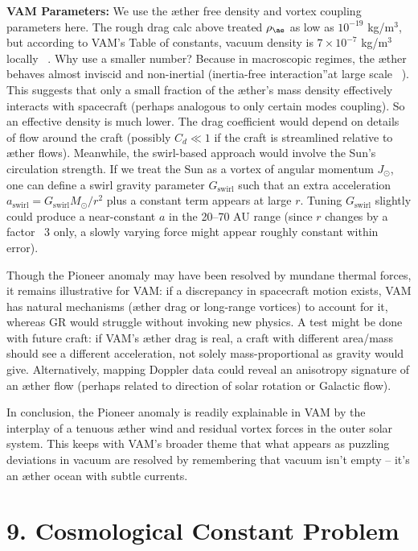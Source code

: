 \documentclass[a4paper, aps,preprint,superscriptaddress, 12pt]{revtex4}
\begin{document}
\textbf{VAM Parameters:} We use the æther free density and vortex coupling parameters here. The rough drag calc above treated $\rho_{\ae}$ as low as $10^{-19}$ kg/m$^3$, but according to VAM's Table of constants, vacuum density is $7\times10^{-7}$ kg/m$^3$ locally~\cite{VAM_constants} . Why use a smaller number? Because in macroscopic regimes, the æther behaves almost inviscid and non-inertial (\grqq inertia-free interaction\textquotedblright at large scale~\cite{Iskandarani2025b} ). This suggests that only a small fraction of the æther's mass density effectively interacts with spacecraft (perhaps analogous to only certain modes coupling). So an effective density is much lower. The drag coefficient would depend on details of flow around the craft (possibly $C_d\ll1$ if the craft is streamlined relative to æther flows). Meanwhile, the swirl-based approach would involve the Sun's circulation strength. If we treat the Sun as a vortex of angular momentum $J_\odot$, one can define a swirl gravity parameter $G_{\text{swirl}}$ such that an extra acceleration $a_{\text{swirl}} = G_{\text{swirl}} M_\odot/r^2$ plus a constant term appears at large $r$. Tuning $G_{\text{swirl}}$ slightly could produce a near-constant $a$ in the 20–70 AU range (since $r$ changes by a factor ~3 only, a slowly varying force might appear roughly constant within error).


Though the Pioneer anomaly may have been resolved by mundane thermal forces, it remains illustrative for VAM: if a discrepancy in spacecraft motion exists, VAM has natural mechanisms (æther drag or long-range vortices) to account for it, whereas GR would struggle without invoking new physics. A test might be done with future craft: if VAM's æther drag is real, a craft with different area/mass should see a different acceleration, not solely mass-proportional as gravity would give. Alternatively, mapping Doppler data could reveal an anisotropy signature of an æther flow (perhaps related to direction of solar rotation or Galactic flow).


In conclusion, the Pioneer anomaly is readily explainable in VAM by the interplay of a tenuous æther wind and residual vortex forces in the outer solar system. This keeps with VAM's broader theme that what appears as puzzling deviations in vacuum are resolved by remembering that vacuum isn't empty – it's an æther ocean with subtle currents.


\section*{9. Cosmological Constant Problem}
\end{document}
